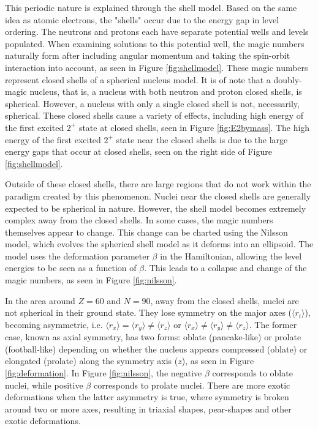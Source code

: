 This periodic nature is explained through the shell model. Based on the same idea as atomic electrons, the "shells" occur due to the energy gap in level ordering. The neutrons and protons each have separate potential wells and levels populated. When examining solutions to this potential well, the magic numbers naturally form after including angular momentum and taking the spin-orbit interaction into account, as seen in Figure \ref{fig:shellmodel}. These magic numbers represent closed shells of a spherical nucleus model. It is of note that a doubly-magic nucleus, that is, a nucleus with both neutron and proton closed shells, is spherical. However, a nucleus with only a single closed shell is not, necessarily, spherical. These closed shells cause a variety of effects, including high energy of the first excited $2^+$ state at closed shells, seen in Figure \ref{fig:E2bymass}. The high energy of the first excited $2^+$ state near the closed shells is due to the large energy gaps that occur at closed shells, seen on the right side of Figure \ref{fig:shellmodel}.





% 

Outside of these closed shells, there are large regions that do not work within the paradigm created by this phenomenon. Nuclei near the closed shells are generally expected to be spherical in nature. However, the shell model becomes extremely complex away from the closed shells. In some cases, the magic numbers themselves appear to change. This change can be charted using the Nilsson model, which evolves the spherical shell model as it deforms into an ellipsoid. The model uses the \mbox{deformation} parameter $\beta$ in the Hamiltonian, allowing the level energies to be seen as a function of $\beta$. This leads to a collapse and change of the magic numbers, as seen in Figure \ref{fig:nilsson}.



In the area around $Z=60$ and $N=90$, away from the closed shells, nuclei are not spherical in their ground state. They lose symmetry on the major axes ($\langle r_i \rangle$), becoming asymmetric, i.e. $\langle r_x \rangle=\langle r_y\rangle\neq \langle r_z\rangle$ or $\langle r_x \rangle \neq \langle r_y \rangle \neq \langle r_z \rangle$. The former case, known as axial symmetry, has two forms: oblate (pancake-like) or prolate (football-like) depending on whether the nucleus appears compressed (oblate) or elongated (prolate) along the symmetry axis ($z$), as seen in Figure \ref{fig:deformation}. In Figure \ref{fig:nilsson}, the negative $\beta$ corresponds to oblate nuclei, while positive $\beta$ corresponds to prolate nuclei. There are more exotic deformations when the latter asymmetry is true, where symmetry is broken around two or more axes, resulting in triaxial shapes, pear-shapes and other exotic deformations.

